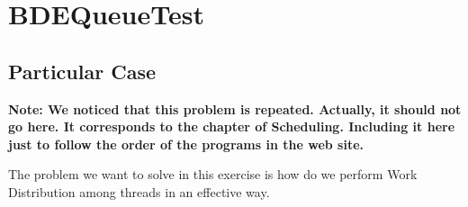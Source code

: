 \section{\textbf{BDEQueueTest}}
\subsection{Particular Case}
\par
\textbf{Note: We noticed that this problem is repeated. Actually, it should not
go here. It corresponds to the chapter of Scheduling. Including it here just to
follow the order of the programs in the web site.}
\par
The problem we want to solve in this exercise is how do we perform Work
Distribution among threads in an effective way.
\par
